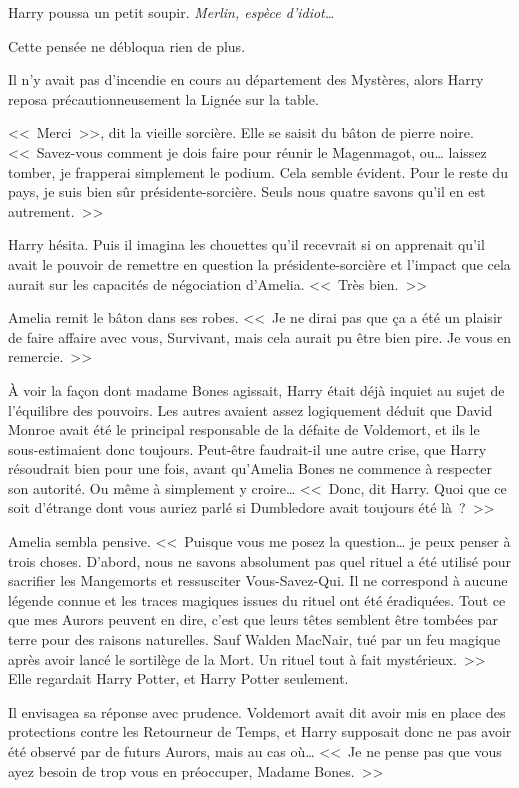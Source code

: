 Harry poussa un petit soupir. \emph{Merlin, espèce d'idiot…}

Cette pensée ne débloqua rien de plus.

Il n'y avait pas d'incendie en cours au département des Mystères, alors Harry reposa précautionneusement la Lignée sur la table.

<<~Merci~>>, dit la vieille sorcière. Elle se saisit du bâton de pierre noire. <<~Savez-vous comment je dois faire pour réunir le Magenmagot, ou… laissez tomber, je frapperai simplement le podium. Cela semble évident. Pour le reste du pays, je suis bien sûr présidente-sorcière. Seuls nous quatre savons qu'il en est autrement.~>>

Harry hésita. Puis il imagina les chouettes qu'il recevrait si on apprenait qu'il avait le pouvoir de remettre en question la présidente-sorcière et l'impact que cela aurait sur les capacités de négociation d'Amelia. <<~Très bien.~>>

Amelia remit le bâton dans ses robes. <<~Je ne dirai pas que ça a été un plaisir de faire affaire avec vous, Survivant, mais cela aurait pu être bien pire. Je vous en remercie.~>>

À voir la façon dont madame Bones agissait, Harry était déjà inquiet au sujet de l'équilibre des pouvoirs. Les autres avaient assez logiquement déduit que David Monroe avait été le principal responsable de la défaite de Voldemort, et ils le sous-estimaient donc toujours. Peut-être faudrait-il une autre crise, que Harry résoudrait bien pour une fois, avant qu'Amelia Bones ne commence à respecter son autorité. Ou même à simplement y croire… <<~Donc, dit Harry. Quoi que ce soit d'étrange dont vous auriez parlé si Dumbledore avait toujours été là~?~>>

Amelia sembla pensive. <<~Puisque vous me posez la question… je peux penser à trois choses. D'abord, nous ne savons absolument pas quel rituel a été utilisé pour sacrifier les Mangemorts et ressusciter Vous-Savez-Qui. Il ne correspond à aucune légende connue et les traces magiques issues du rituel ont été éradiquées. Tout ce que mes Aurors peuvent en dire, c'est que leurs têtes semblent être tombées par terre pour des raisons naturelles. Sauf Walden MacNair, tué par un feu magique après avoir lancé le sortilège de la Mort. Un rituel tout à fait mystérieux.~>> Elle regardait Harry Potter, et Harry Potter seulement.

Il envisagea sa réponse avec prudence. Voldemort avait dit avoir mis en place des protections contre les Retourneur de Temps, et Harry supposait donc ne pas avoir été observé par de futurs Aurors, mais au cas où… <<~Je ne pense pas que vous ayez besoin de trop vous en préoccuper, Madame Bones.~>>

